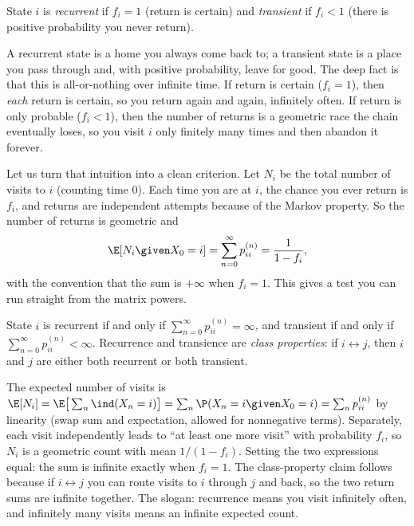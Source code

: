 \begin{definition}
\label{ch23:def-recurrent}
State $i$ is \emph{recurrent} if $f_i = 1$ (return is certain) and \emph{transient} if
$f_i < 1$ (there is positive probability you never return).
\end{definition}

\begin{intuitionbox}
A recurrent state is a home you always come back to; a transient state is a place you pass
through and, with positive probability, leave for good. The deep fact is that this is
all-or-nothing over infinite time. If return is certain ($f_i=1$), then \emph{each} return is
certain, so you return again and again, infinitely often. If return is only probable
($f_i<1$), then the number of returns is a geometric race the chain eventually loses, so you
visit $i$ only finitely many times and then abandon it forever.
\end{intuitionbox}

Let us turn that intuition into a clean criterion. Let $N_i$ be the total number of visits to
$i$ (counting time $0$). Each time you are at $i$, the chance you ever return is $f_i$, and
returns are independent attempts because of the Markov property. So the number of returns is
geometric and
\[
  \E[N_i \given X_0 = i] = \sum_{n=0}^{\infty} p_{ii}^{(n)} = \frac{1}{1 - f_i},
\]
with the convention that the sum is $+\infty$ when $f_i = 1$. This gives a test you can run
straight from the matrix powers.

\begin{theorem}
\label{ch23:recurrence-test}
State $i$ is recurrent if and only if $\displaystyle\sum_{n=0}^{\infty} p_{ii}^{(n)} = \infty$,
and transient if and only if $\displaystyle\sum_{n=0}^{\infty} p_{ii}^{(n)} < \infty$.
Recurrence and transience are \emph{class properties}: if $i \leftrightarrow j$, then $i$ and
$j$ are either both recurrent or both transient.
\end{theorem}

\begin{whybox}
The expected number of visits is $\E[N_i] = \E\big[\sum_n \ind(X_n=i)\big] = \sum_n
\P(X_n=i \given X_0=i) = \sum_n p_{ii}^{(n)}$ by linearity (swap sum and expectation, allowed
for nonnegative terms). Separately, each visit independently leads to ``at least one more
visit'' with probability $f_i$, so $N_i$ is a geometric count with mean $1/(1-f_i)$. Setting
the two expressions equal: the sum is infinite exactly when $f_i = 1$. The class-property
claim follows because if $i \leftrightarrow j$ you can route visits to $i$ through $j$ and
back, so the two return sums are infinite together. The slogan: recurrence means you visit
infinitely often, and infinitely many visits means an infinite expected count.
\end{whybox}

